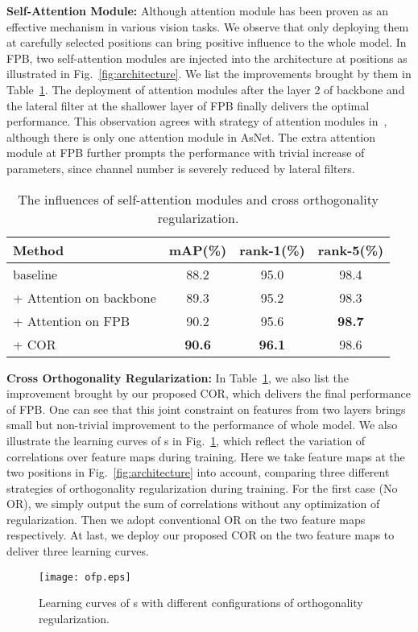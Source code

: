 \documentclass[journal]{IEEEtran}
\begin{document}
\textbf{Self-Attention Module:} Although attention module has been proven as an effective mechanism in various vision tasks.
We observe that only deploying them at carefully selected positions can bring positive influence to the whole model.
In FPB, two self-attention modules are injected into the architecture at positions as illustrated in Fig.~\ref{fig:architecture}.
We list the improvements brought by them in Table~\ref{tab:ablation2}.
The deployment of attention modules after the layer 2 of backbone and the lateral filter at the shallower layer of FPB finally delivers the optimal performance. 
This observation agrees with strategy of attention modules in~\cite{9094042}, although there is only one attention module in AsNet.
The extra attention module at FPB further prompts the performance with trivial increase of parameters, since channel number is severely reduced by lateral filters.
\begin{table}
  \centering
  \caption{The influences of self-attention modules and cross orthogonality regularization.}
  \label{tab:ablation2}
  \small
  \setlength{\tabcolsep}{3pt}
  \begin{tabular}{l|ccc}\hline
    Method & mAP(\%) & rank-1(\%) & rank-5(\%) \tabularnewline
    \hline
    baseline & 88.2 & 95.0 & 98.4 \tabularnewline
    + Attention on backbone & 89.3 & 95.2 & 98.3 \tabularnewline
    + Attention on FPB & 90.2 & 95.6 & \textbf{98.7} \tabularnewline
    + COR & \textbf{90.6} & \textbf{96.1} & 98.6 \tabularnewline
    \hline
  \end{tabular}
\end{table}

\textbf{Cross Orthogonality Regularization:}
In Table~\ref{tab:ablation2}, we also list the improvement brought by our proposed COR, which delivers the final performance of FPB.
One can see that this joint constraint on features from two layers brings small but non-trivial improvement to the performance of whole model.
We also illustrate the learning curves of s in Fig.~\ref{fig:lors}, which reflect the variation of correlations over feature maps during training.
Here we take feature maps at the two positions in Fig.~\ref{fig:architecture} into account, comparing three different strategies of orthogonality regularization during training.
For the first case (No OR), we simply output the sum of correlations without any optimization of regularization.
Then we adopt conventional OR on the two feature maps respectively.
At last, we deploy our proposed COR on the two feature maps to deliver three learning curves.
\begin{figure}
\centering
  \texttt{[image: ofp.eps]}
  \caption{Learning curves of s with different configurations of orthogonality regularization.}
  \label{fig:lors}
\end{figure}
\end{document}

